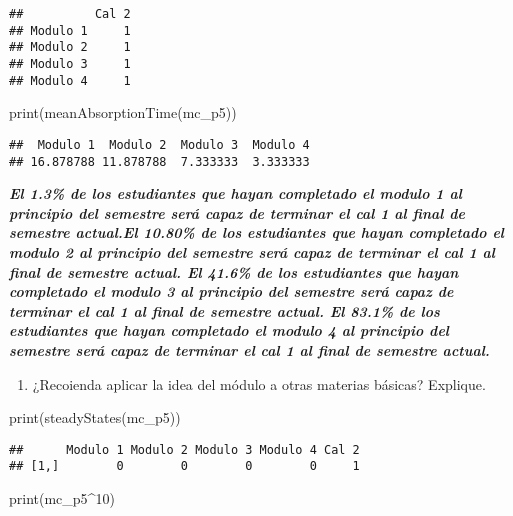 \documentclass[
]{article}
\newenvironment{Shaded}{\begin{snugshade}}{\end{snugshade}}
\newcommand{\DecValTok}[1]{\textcolor[rgb]{0.00,0.00,0.81}{#1}}
\newcommand{\FunctionTok}[1]{\textcolor[rgb]{0.00,0.00,0.00}{#1}}
\newcommand{\NormalTok}[1]{#1}
\newcommand{\SpecialCharTok}[1]{\textcolor[rgb]{0.00,0.00,0.00}{#1}}
\providecommand{\tightlist}{%
  \setlength{\itemsep}{0pt}\setlength{\parskip}{0pt}}
\begin{document}
\begin{verbatim}
##          Cal 2
## Modulo 1     1
## Modulo 2     1
## Modulo 3     1
## Modulo 4     1
\end{verbatim}

\begin{Shaded}
\begin{Highlighting}[]
\FunctionTok{print}\NormalTok{(}\FunctionTok{meanAbsorptionTime}\NormalTok{(mc\_p5))}
\end{Highlighting}
\end{Shaded}

\begin{verbatim}
##  Modulo 1  Modulo 2  Modulo 3  Modulo 4 
## 16.878788 11.878788  7.333333  3.333333
\end{verbatim}

\textbf{\emph{El 1.3\% de los estudiantes que hayan completado el modulo
1 al principio del semestre será capaz de terminar el cal 1 al final de
semestre actual.El 10.80\% de los estudiantes que hayan completado el
modulo 2 al principio del semestre será capaz de terminar el cal 1 al
final de semestre actual. El 41.6\% de los estudiantes que hayan
completado el modulo 3 al principio del semestre será capaz de terminar
el cal 1 al final de semestre actual. El 83.1\% de los estudiantes que
hayan completado el modulo 4 al principio del semestre será capaz de
terminar el cal 1 al final de semestre actual.}}

\begin{enumerate}
\def\labelenumi{\alph{enumi})}
\setcounter{enumi}{3}
\tightlist
\item
  ¿Recoienda aplicar la idea del módulo a otras materias básicas?
  Explique.
\end{enumerate}

\begin{Shaded}
\begin{Highlighting}[]
 \FunctionTok{print}\NormalTok{(}\FunctionTok{steadyStates}\NormalTok{(mc\_p5))}
\end{Highlighting}
\end{Shaded}

\begin{verbatim}
##      Modulo 1 Modulo 2 Modulo 3 Modulo 4 Cal 2
## [1,]        0        0        0        0     1
\end{verbatim}

\begin{Shaded}
\begin{Highlighting}[]
\FunctionTok{print}\NormalTok{(mc\_p5}\SpecialCharTok{\^{}}\DecValTok{10}\NormalTok{)}
\end{Highlighting}
\end{Shaded}
\end{document}
